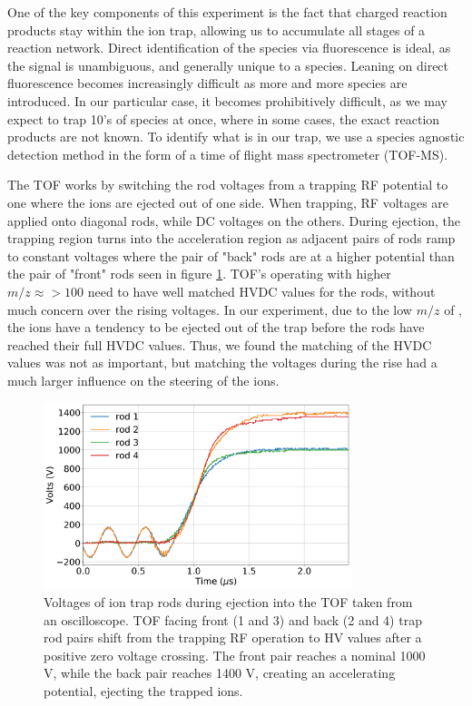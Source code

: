 One of the key components of this experiment is the fact that charged reaction products stay within the ion trap, allowing us to accumulate all stages of a reaction network. Direct identification of the species via fluorescence is ideal, as the signal is unambiguous, and generally unique to a species. Leaning on direct fluorescence becomes increasingly difficult as more and more species are introduced. In our particular case, it becomes prohibitively difficult, as we may expect to trap 10's of species at once, where in some cases, the exact reaction products are not known. To identify what is in our trap, we use a species agnostic detection method in the form of a time of flight mass spectrometer (TOF-MS).

The TOF works by switching the rod voltages from a trapping RF potential to one where the ions are ejected out of one side. When trapping, RF voltages are applied onto diagonal rods, while DC voltages on the others. During ejection, the trapping region turns into the acceleration region as adjacent pairs of rods ramp to constant voltages where the pair of "back" rods are at a higher potential than the pair of "front" rods seen in figure \ref{fig: rod traces}. TOF's operating with higher $m/z \approx>100 $ need to have well matched HVDC values for the rods, without much concern over the rising voltages. In our experiment, due to the low $m/z$ of , the ions have a tendency to be ejected out of the trap before the rods have reached their full HVDC values. Thus, we found the matching of the HVDC values was not as important, but matching the voltages during the rise had a much larger influence on the steering of the ions.

\begin{figure}[H]
	\centering
	\includegraphics[width=0.8\textwidth]{images/rod_traces.png}
	\caption{Voltages of ion trap rods during ejection into the TOF taken from an oscilloscope. TOF facing front (1 and 3) and back (2 and 4) trap rod pairs shift from the trapping RF operation to HV values after a positive zero voltage crossing. The front pair reaches a nominal 1000 V, while the back pair reaches 1400 V, creating an accelerating potential, ejecting the trapped ions.}
	\label{fig: rod traces}
\end{figure}

